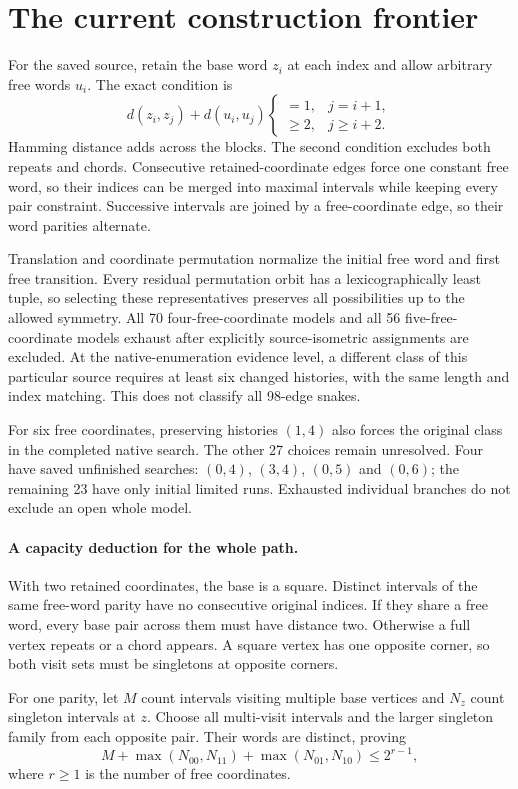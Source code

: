 \documentclass[11pt,a4paper]{article}
\begin{document}
\section{The current construction frontier}
For the saved source, retain the base word $z_i$ at each index and
allow arbitrary free words $u_i$. The exact condition is
\[
d(z_i,z_j)+d(u_i,u_j)
\begin{cases}
=1,&j=i+1,\\
\ge2,&j\ge i+2.
\end{cases}
\]
Hamming distance adds across the blocks. The second condition excludes
both repeats and chords. Consecutive retained-coordinate edges force
one constant free word, so their indices can be merged into maximal
intervals while keeping every pair constraint. Successive intervals
are joined by a free-coordinate edge, so their word parities alternate.

Translation and coordinate permutation normalize the initial free
word and first free transition. Every residual permutation orbit has
a lexicographically least tuple, so selecting these representatives
preserves all possibilities up to the allowed symmetry. All 70
four-free-coordinate models and all 56 five-free-coordinate models
exhaust after explicitly source-isometric assignments are excluded.
At the native-enumeration evidence level, a different class of this
particular source requires at least six changed histories, with the
same length and index matching. This does not classify all 98-edge
snakes.

For six free coordinates, preserving histories $(1,4)$ also forces the
original class in the completed native search. The other 27 choices
remain unresolved. Four have saved unfinished searches:
$(0,4)$, $(3,4)$, $(0,5)$ and $(0,6)$; the remaining 23 have only initial
limited runs. Exhausted individual branches do not exclude an open whole model.

\paragraph{A capacity deduction for the whole path.}
With two retained coordinates, the base is a square. Distinct intervals
of the same free-word parity have no consecutive original indices.
If they share a free word, every base pair across them must have
distance two. Otherwise a full vertex repeats or a chord appears.
A square vertex has one opposite corner, so both visit sets must be
singletons at opposite corners.

For one parity, let $M$ count intervals visiting multiple base vertices
and $N_z$ count singleton intervals at $z$. Choose all multi-visit intervals
and the larger singleton family from each opposite pair. Their words
are distinct, proving
\[
\boxed{M+\max(N_{00},N_{11})+\max(N_{01},N_{10})\le2^{r-1},}
\]
where $r\ge1$ is the number of free coordinates.
\end{document}
